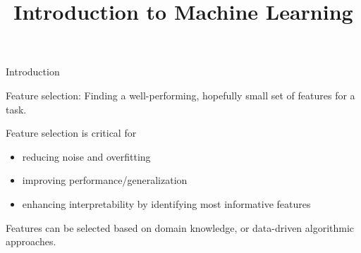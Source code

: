 \documentclass[11pt,compress,t,notes=noshow, xcolor=table]{beamer}
\title{Introduction to Machine Learning}
\date{}
\begin{document}

  \begin{vbframe}{Introduction}

    Feature selection: Finding a well-performing, 
    hopefully small set of features for a task.
    

    \lz
    Feature selection is critical for 
    \begin{itemize}
       \item reducing noise and overfitting
       \item improving performance/generalization
       \item enhancing interpretability by identifying most informative features
    \end{itemize}

 \vspace{0.5cm}
   

    Features can be selected based on domain knowledge, or data-driven algorithmic approaches.
  \end{vbframe}


%
%
\end{document}
